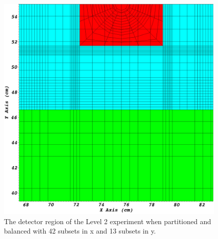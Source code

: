 \begin{figure}[H]
\centering
\includegraphics[scale=0.15]{../../figures/level2_42x13_balanced_zoom.png}
\caption{The detector region of the Level 2 experiment when partitioned and balanced with 42 subsets in x and 13 subsets in y.}
\label{level2_42x13_balanced_zoom}
\end{figure}
